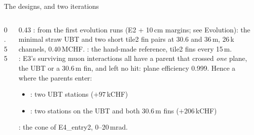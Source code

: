 
\begin{frame}{The designs, and two iterations}
  \begin{columns}[c]
    \begin{column}{0.55\textwidth}
      \\[1mm]
    \end{column}
    \begin{column}{0.43\textwidth}\footnotesize
      : from the first evolution runs (E2 + 10\,cm margins; see Evolution): the minimal straw UBT and two short tile2 fin pairs at 30.6 and 36\,m, 26\,k channels, 0.40\,MCHF. : the hand-made reference, tile2 fins every 15\,m.\\[1.5mm]
      : E3's surviving muon interactions all have a parent that crossed \emph{one} plane, the UBT or a 30.6\,m fin, and left no hit: plane efficiency 0.999. Hence a  where the parents enter:
      \begin{itemize}\scriptsize
        \item {}: two UBT stations ($+97$\,kCHF)
        \item {}: two stations on the UBT and both 30.6\,m fins ($+206$\,kCHF)
      \end{itemize}
      : the cone of E4\_entry2, 0--20\,mrad.\\[1mm]
    \end{column}
  \end{columns}
\end{frame}

